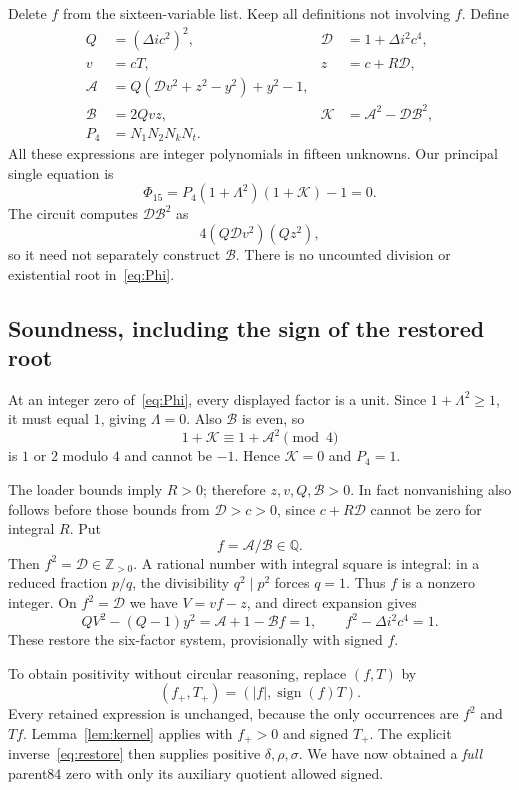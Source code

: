 \documentclass[11pt]{article}
\newcommand{\QQ}{\mathbb Q}
\newcommand{\Pos}{\mathbb Z_{>0}}
\theoremstyle{remark}\newtheorem{remark}[theorem]{Remark}
\begin{document}
Delete $f$ from the sixteen-variable list. Keep all definitions not involving $f$. Define
\begin{align}
 Q&=(\Delta ic^2)^2,&\mathcal D&=1+\Delta i^2c^4,\nonumber\\
 v&=cT,&z&=c+R\mathcal D,\nonumber\\
 \mathcal A&=Q(\mathcal D v^2+z^2-y^2)+y^2-1,\label{eq:rootdata}\\
 \mathcal B&=2Qvz,&\mathcal K&=\mathcal A^2-\mathcal D\mathcal B^2,\nonumber\\
 P_4&=N_1N_2N_kN_t.\nonumber
\end{align}
All these expressions are integer polynomials in fifteen unknowns. Our principal single equation is
\begin{equation}\boxed{\quad\Phi_{15}=P_4(1+\Lambda^2)(1+\mathcal K)-1=0.\quad}\label{eq:Phi}
\end{equation}
The circuit computes $\mathcal D\mathcal B^2$ as
\[
4(Q\mathcal D v^2)(Qz^2),
\]
so it need not separately construct $\mathcal B$. There is no uncounted division or existential root in~\eqref{eq:Phi}.

\subsection{Soundness, including the sign of the restored root}

At an integer zero of~\eqref{eq:Phi}, every displayed factor is a unit. Since $1+\Lambda^2\ge1$, it must equal $1$, giving $\Lambda=0$. Also $\mathcal B$ is even, so
\[
 1+\mathcal K\equiv1+\mathcal A^2\pmod4
\]
is $1$ or $2$ modulo $4$ and cannot be $-1$. Hence $\mathcal K=0$ and $P_4=1$.

The loader bounds imply $R>0$; therefore $z,v,Q,\mathcal B>0$. In fact nonvanishing also follows before those bounds from $\mathcal D>c>0$, since $c+R\mathcal D$ cannot be zero for integral $R$. Put
\[
 f=\mathcal A/\mathcal B\in\QQ.
\]
Then $f^2=\mathcal D\in\Pos$. A rational number with integral square is integral: in a reduced fraction $p/q$, the divisibility $q^2\mid p^2$ forces $q=1$. Thus $f$ is a nonzero integer. On $f^2=\mathcal D$ we have $V=vf-z$, and direct expansion gives
\[
 QV^2-(Q-1)y^2=\mathcal A+1-\mathcal Bf=1,
 \qquad f^2-\Delta i^2c^4=1.
\]
These restore the six-factor system, provisionally with signed $f$.

To obtain positivity without circular reasoning, replace $(f,T)$ by
\[
 (f_+,T_+)=(|f|,\operatorname{sign}(f)T).
\]
Every retained expression is unchanged, because the only occurrences are $f^2$ and $Tf$. Lemma~\ref{lem:kernel} applies with $f_+>0$ and signed $T_+$. The explicit inverse~\eqref{eq:restore} then supplies positive $\delta,\rho,\sigma$. We have now obtained a \emph{full} parent84 zero with only its auxiliary quotient allowed signed.
\end{document}
